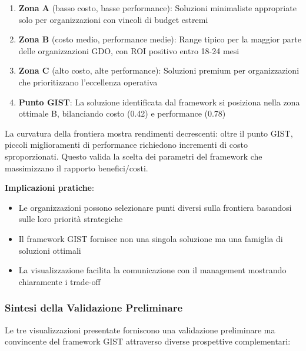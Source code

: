 \begin{enumerate}
    \item \textbf{Zona A} (basso costo, basse performance): Soluzioni minimaliste appropriate solo per organizzazioni con vincoli di budget estremi
    
    \item \textbf{Zona B} (costo medio, performance medie): Range tipico per la maggior parte delle organizzazioni GDO, con ROI positivo entro 18-24 mesi
    
    \item \textbf{Zona C} (alto costo, alte performance): Soluzioni premium per organizzazioni che prioritizzano l'eccellenza operativa
    
    \item \textbf{Punto GIST}: La soluzione identificata dal framework si posiziona nella zona ottimale B, bilanciando costo (0.42) e performance (0.78)
\end{enumerate}

La curvatura della frontiera mostra rendimenti decrescenti: oltre il punto GIST, piccoli miglioramenti di performance richiedono incrementi di costo sproporzionati. Questo valida la scelta dei parametri del framework che massimizzano il rapporto benefici/costi.

\textbf{Implicazioni pratiche}:
\begin{itemize}
    \item Le organizzazioni possono selezionare punti diversi sulla frontiera basandosi sulle loro priorità strategiche
    \item Il framework GIST fornisce non una singola soluzione ma una famiglia di soluzioni ottimali
    \item La visualizzazione facilita la comunicazione con il management mostrando chiaramente i trade-off
\end{itemize}
\subsubsection{\texorpdfstring{\textbf{Sintesi della Validazione Preliminare}}{1.5.5.4 Sintesi della Validazione Preliminare}}\label{sintesi-preliminare}

Le tre visualizzazioni presentate forniscono una validazione preliminare ma convincente del framework GIST attraverso diverse prospettive complementari:

